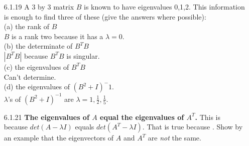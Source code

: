 \documentclass[10pt,twoside,reqno]{article}
\begin{document}
\begin{enumerate}
\vspace{3mm}
\item[6.1.19] A 3 by 3 matrix $B$ is known to have eigenvalues 0,1,2. This information is enough to find three of these (give the answers where possible): \\ \vspace{2mm}
{\addtolength{\leftskip}{10mm}
(a) the rank of $B$ \\ \vspace{2mm}
{\addtolength{\leftskip}{5mm}
$B$ is a rank two because it has a $\lambda=0$. \\
}
\vspace{3mm}
(b) the determinate of $B^TB$ \\ \vspace{2mm}
{\addtolength{\leftskip}{5mm}
$|B^TB|$ because $B^TB$ is singular. \\
}
\vspace{3mm}
(c) the eigenvalues of $B^TB$ \\ \vspace{2mm}
{\addtolength{\leftskip}{5mm}
Can't determine. \\
}
\vspace{3mm}
(d) the eigenvalues of $(B^2+I)^-1$. \\ \vspace{2mm}
{\addtolength{\leftskip}{5mm}
$\lambda$'s of $(B^2+I)^{-1}$ are $\lambda=1,\frac{1}{2},\frac{1}{5}$. \\
}
\vspace{3mm}
}
\item[6.1.21] \textbf{The eigenvalues of $A$ equal the eigenvalues of $A^T$.} This is because $det(A - \lambda I)$ equals $det(A^T - \lambda I)$. That is true because \underline{\hspace{10mm}}. Show by an example that the eigenvectors of $A$ and $A^T$ are \textit{not} the same.\\ \vspace{2mm}

\end{enumerate}
\end{document}

